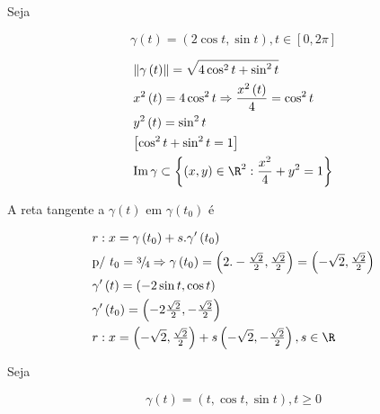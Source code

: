 \documentclass[11pt, oneside, a4paper]{gsm-l}
\begin{document}
\begin{exem}
Seja

\[
    \gamma \left( t \right) = \left( {2\cos t,\sin t} \right),t \in \left[ {0,2\pi } \right]
\]

\end{exem}

\begin{sol}
\[
\begin{gathered}
  \left\| {\gamma \left( t \right)} \right\| = \sqrt {4\cos ^2 t + \sin ^2 t}  \hfill \\
x^2 \left( t \right) = 4\cos ^2 t \Rightarrow \frac{{x^2 \left( t \right)}}
{4} = \cos ^2 t \hfill \\
y^2 \left( t \right) = \sin ^2 t \hfill \\
\left[ {\cos ^2 t + \sin ^2 t = 1} \right] \hfill \\
  \operatorname{Im} \gamma  \subset \left\{ {\left( {x,y} \right) \in \R^2 :\frac{{x^2 }}
{4} + y^2  = 1} \right\} \hfill \\
\end{gathered}
\]



A reta tangente a $\gamma \left( t \right)$ em $\gamma \left( t_0 \right)$ é

\[
\begin{gathered}
r:x = \gamma \left( {t_0 } \right) + s.\gamma '\left( {t_0 } \right) \hfill \\
{\text{p/ }}t_0  = {\raise0.5ex\hbox{$\scriptstyle 3$}
\kern-0.1em/\kern-0.15em
\lower0.25ex\hbox{$\scriptstyle 4$}} \Rightarrow \gamma \left( {t_0 } \right) = \left( {2. - \tfrac{{\sqrt 2 }}
{2},\tfrac{{\sqrt 2 }}
{2}} \right) = \left( { - \sqrt 2 ,\tfrac{{\sqrt 2 }}
{2}} \right) \hfill \\
\gamma '\left( t \right) = \left( { - 2\sin t,\cos t} \right) \hfill \\
\gamma '\left( {t_0 } \right) = \left( { - 2\tfrac{{\sqrt 2 }}
{2}, - \tfrac{{\sqrt 2 }}
{2}} \right) \hfill \\
r:x = \left( { - \sqrt 2 ,\tfrac{{\sqrt 2 }}
{2}} \right) + s\left( { - \sqrt 2 , - \tfrac{{\sqrt 2 }}
{2}} \right),s \in \R \hfill \\
\end{gathered}
\]

\end{sol}

\begin{exem}
Seja

\[
\gamma \left( t \right) = \left( {t,\cos t,\sin t} \right),t \geqslant 0
\]

\end{exem}
\end{document}
